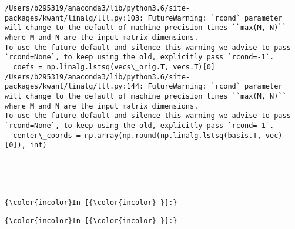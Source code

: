 \documentclass[11pt]{article}
\begin{document}
    \begin{Verbatim}[commandchars=\\\{\}]
/Users/b295319/anaconda3/lib/python3.6/site-packages/kwant/linalg/lll.py:103: FutureWarning: `rcond` parameter will change to the default of machine precision times ``max(M, N)`` where M and N are the input matrix dimensions.
To use the future default and silence this warning we advise to pass `rcond=None`, to keep using the old, explicitly pass `rcond=-1`.
  coefs = np.linalg.lstsq(vecs\_orig.T, vecs.T)[0]
/Users/b295319/anaconda3/lib/python3.6/site-packages/kwant/linalg/lll.py:144: FutureWarning: `rcond` parameter will change to the default of machine precision times ``max(M, N)`` where M and N are the input matrix dimensions.
To use the future default and silence this warning we advise to pass `rcond=None`, to keep using the old, explicitly pass `rcond=-1`.
  center\_coords = np.array(np.round(np.linalg.lstsq(basis.T, vec)[0]), int)

    \end{Verbatim}

    \begin{center}
    \end{center}
    { \hspace*{\fill} \\}
    
    \begin{center}
    \end{center}
    { \hspace*{\fill} \\}
    
    \begin{Verbatim}[commandchars=\\\{\}]
{\color{incolor}In [{\color{incolor} }]:} 
\end{Verbatim}


    \begin{Verbatim}[commandchars=\\\{\}]
{\color{incolor}In [{\color{incolor} }]:} 
\end{Verbatim}



    
    
    
    
\end{document}
